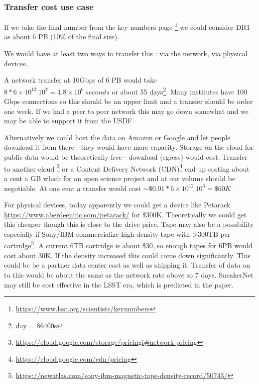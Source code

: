 \subsubsection{Transfer cost use case \label{sec:xfercost}}
If we take the final number from the key numbers page \footnote{\url{https://www.lsst.org/scientists/keynumbers}} we could consider \gls{DR1} as about 6 \gls{PB} (10\% of the final size).

We would have at least  two ways to transfer this : via the network, via physical devices.

A network transfer at 10Gbps of 6 \gls{PB} would take $8 * 6 \times 10^{12} \ 10^7 = 4.8 \times 10^{6}~seconds $ or about 55 days\footnote{ day = 86400s}.
Many institutes have 100 Gbps connections so this should be an upper limit and a transfer should be order one week. If we had a peer to peer network this may go down somewhat and we may be able to support it from the \gls{USDF}.

Alternatively we could host the data on Amazon or Google and let people download it from there - they would have more capacity.
Storage on the cloud  for public data would be theoretically free - download (egress)  would  cost.
Transfer to another cloud \footnote{\url{https://cloud.google.com/storage/pricingi\#network-pricing}}  or
 a Content Delivery Network (\gls{CDN})\footnote{\url{https://cloud.google.com/cdn/pricing}}
 end up costing  about a cent a \gls{GB} which for an open science project and at our volume  should  be negotiable.  At one cent a transfer would cost
  $\sim \$0.01 * 6 \times 10^{12} \ 10^6 = \$60K$.

For physical devices, today apparently we could get a device like Petarack \url{https://www.aberdeeninc.com/petarack/} for \$300K.
Theoretically we could get this cheaper though this is close to the drive price,
Tape may also be a possibility especially if Sony/IBM commercialize high density tape with >300TB per cartridge\footnote{\url{https://newatlas.com/sony-ibm-magnetic-tape-density-record/50743/}}. A current 6TB cartridge is about \$30, so enough tapes for 6PB would cost about  30K. If the density increased this could come down significantly.
This could be be a partner data center cost as well as shipping it. Transfer of data on to this would be about the same as the network rate above so 7 days. SneakerNet \cite{2002cs........8011G} may still be  cost effective in the \gls{LSST} era, which is predicted in the  paper.
